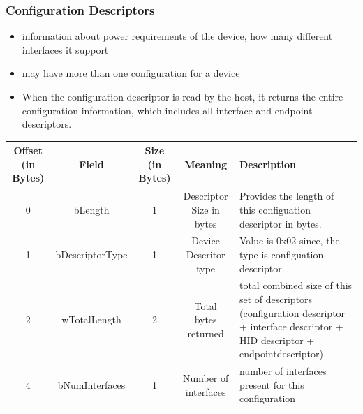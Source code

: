 \documentclass{article}
\begin{document}
\subsubsection{Configuration Descriptors}
\begin{itemize}
    \item information about power requirements of the device, how many different interfaces it support
    \item may have more than one configuration for a device
    \item When the configuration descriptor is read by the host, it returns the entire configuration information, which includes all interface and endpoint descriptors.
\end{itemize}


\begin{table}[H]
    \centering
    \begin{adjustbox}{max width=\textwidth}
        \begin{tabular}{|c|c|c|c|p{6cm}|}
            \hline
            \textbf{Offset (in Bytes)} & \textbf{Field}      & \textbf{Size (in Bytes)} & \textbf{Meaning}                      & \textbf{Description}                                                                                                                   \\
            \hline
            0                          & bLength             & 1                        & Descriptor Size in bytes              & Provides the length of this configuation descriptor in bytes.                                                                          \\
            \hline
            1                          & bDescriptorType     & 1                        & Device Descritor type                 & Value is 0x02 since, the type is configuation descriptor.                                                                              \\
            \hline
            2                          & wTotalLength        & 2                        & Total bytes returned                  & total combined size of this set of descriptors (configuration descriptor + interface descriptor + HID descriptor + endpointdescriptor) \\
            \hline
            4                          & bNumInterfaces      & 1                        & Number of interfaces                  & number of interfaces present for this configuration                                                                                    \\

\end{tabular}
\end{adjustbox}
\end{table}
\end{document}
